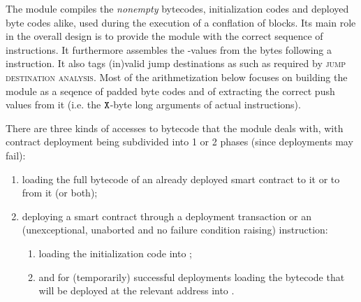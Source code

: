 The \romMod{} module compiles the \emph{nonempty} bytecodes, initialization codes and deployed byte codes alike, used during the execution of a conflation of blocks.
Its main role in the overall design is to provide the \hubMod{} module with the correct sequence of instructions.
It furthermore assembles the -values from the bytes following a  instruction.
It also tags (in)valid jump destinations as such as required by \textsc{jump destination analysis}.
Most of the arithmetization below focuses on building the \romMod{} module  as a seqence of padded byte codes and of extracting the correct push values from it (i.e. the $\texttt{X}$-byte long arguments of actual  instructions).

There are three kinds of accesses to bytecode that the \romMod{} module  deals with, with contract deployment being subdivided into 1 or 2 phases (since deployments may fail):
\begin{enumerate}
    \item loading the full bytecode of an already deployed smart contract to  it or to  from it (or both);
    \item deploying a smart contract through a deployment transaction or an (unexceptional, unaborted and no failure condition raising)  instruction:
        \begin{enumerate}
            \item loading the initialization code into \romMod{};
            \item and for (temporarily) successful deployments loading the bytecode that will be deployed at the relevant address into \romMod{}.
        \end{enumerate}
\end{enumerate}

